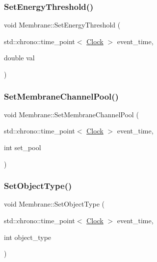 \mbox{\label{classMembrane_a6d0b96fb6d823cc113dd56b8889b1544}} 
\subsubsection{\texorpdfstring{Set\+Energy\+Threshold()}{SetEnergyThreshold()}}
{\footnotesize\ttfamily void Membrane\+::\+Set\+Energy\+Threshold (\begin{DoxyParamCaption}\item[{std\+::chrono\+::time\+\_\+point$<$ \mbox{\hyperlink{universe_8h_a0ef8d951d1ca5ab3cfaf7ab4c7a6fd80}{Clock}} $>$}]{event\+\_\+time,  }\item[{double}]{val }\end{DoxyParamCaption})\hspace{0.3cm}{\ttfamily [inline]}}

\mbox{\label{classMembrane_aeda845ea9577e6a07690acad22ef375f}} 
\subsubsection{\texorpdfstring{Set\+Membrane\+Channel\+Pool()}{SetMembraneChannelPool()}}
{\footnotesize\ttfamily void Membrane\+::\+Set\+Membrane\+Channel\+Pool (\begin{DoxyParamCaption}\item[{std\+::chrono\+::time\+\_\+point$<$ \mbox{\hyperlink{universe_8h_a0ef8d951d1ca5ab3cfaf7ab4c7a6fd80}{Clock}} $>$}]{event\+\_\+time,  }\item[{int}]{set\+\_\+pool }\end{DoxyParamCaption})\hspace{0.3cm}{\ttfamily [inline]}}

\mbox{\label{classMembrane_a5ba2bcb906f3984b28f1030207e106ad}} 
\subsubsection{\texorpdfstring{Set\+Object\+Type()}{SetObjectType()}}
{\footnotesize\ttfamily void Membrane\+::\+Set\+Object\+Type (\begin{DoxyParamCaption}\item[{std\+::chrono\+::time\+\_\+point$<$ \mbox{\hyperlink{universe_8h_a0ef8d951d1ca5ab3cfaf7ab4c7a6fd80}{Clock}} $>$}]{event\+\_\+time,  }\item[{int}]{object\+\_\+type }\end{DoxyParamCaption})}

